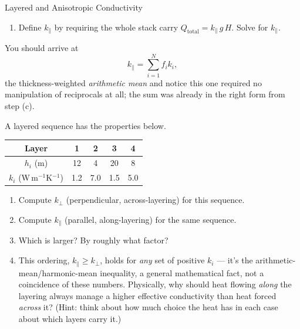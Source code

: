 \begin{activity}{Layered and Anisotropic Conductivity}
\begin{questions}
\begin{enumerate}[label=(\alph*)]
        \item Define $k_\parallel$ by requiring the whole stack carry $Q_\text{total} = k_\parallel\, g\, H$. Solve for $k_\parallel$.
        \answerbox[2cm]
    \end{enumerate}

    You should arrive at
    \begin{equation}
        k_\parallel = \sum_{i=1}^N f_i k_i,
    \end{equation}
    the thickness-weighted \emph{arithmetic mean} and notice this one required no manipulation of reciprocals at all; the sum was already in the right form from step (c).


    A layered sequence has the properties below.

    \begin{center}
    \begin{tabular}{ccccc}
    \toprule
    Layer & 1 & 2 & 3 & 4 \\
    \midrule
    $h_i$ (m) & 12 & 4 & 20 & 8 \\
    $k_i$ (W\,m$^{-1}$K$^{-1}$) & 1.2 & 7.0 & 1.5 & 5.0 \\
    \bottomrule
    \end{tabular}
    \end{center}

    \begin{enumerate}[label=(\alph*)]
        \item Compute $k_\perp$ (perpendicular, across-layering) for this sequence.
        \answerbox[3cm]

        \item Compute $k_\parallel$ (parallel, along-layering) for the same sequence.
        \answerbox[3cm]

        \item Which is larger? By roughly what factor?
        \answerbox[1.5cm]

        \item This ordering, $k_\parallel \ge k_\perp$, holds for \emph{any} set of positive $k_i$ --- it's the arithmetic-mean/harmonic-mean inequality, a general mathematical fact, not a coincidence of these numbers. Physically, why should heat flowing \emph{along} the layering always manage a higher effective conductivity than heat forced \emph{across} it? (Hint: think about how much choice the heat has in each case about which layers carry it.)
        \answerbox[2.5cm]
    \end{enumerate}


\end{questions}
\end{activity}

